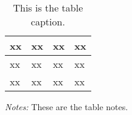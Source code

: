 
\begin{table}[t] %
\caption{\label{tab:xx}This is the table caption.} \vspace{-2pt}  
\fontsize{9}{10}\selectfont %
\begin{tabularx}{1\textwidth}{YP{3.7cm}YY} %
\toprule %
xx & xx & xx  & xx\\
\midrule %
xx & xx & xx & xx\\
xx & xx & xx & xx\\

\bottomrule %
\end{tabularx}
\vspace{1pt}
  
{\footnotesize \textit{Notes:} These are the table notes.}
\end{table}
